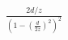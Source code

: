 \documentclass[preview]{standalone}
\begin{document}
\begin{align*}
\frac{2d/z}{(1-(\frac{d}{2z})^{2})^{2}}
\end{align*}
\end{document}

